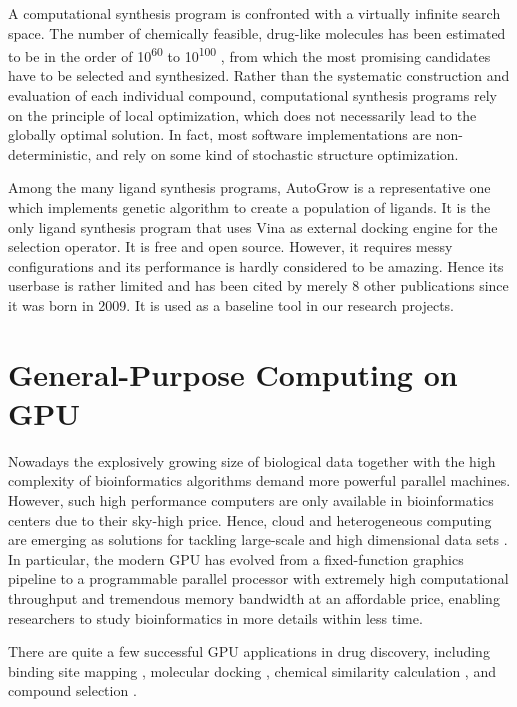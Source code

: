 A computational synthesis program is confronted with a virtually infinite search space. The number of chemically feasible, drug-like molecules has been estimated to be in the order of 10\textsuperscript{60} to 10\textsuperscript{100} \citep{363}, from which the most promising candidates have to be selected and synthesized. Rather than the systematic construction and evaluation of each individual compound, computational synthesis programs rely on the principle of local optimization, which does not necessarily lead to the globally optimal solution. In fact, most software implementations \citep{466,749} are non-deterministic, and rely on some kind of stochastic structure optimization.

Among the many ligand synthesis programs, AutoGrow \citep{466} is a representative one which implements genetic algorithm to create a population of ligands. It is the only ligand synthesis program that uses Vina \citep{595} as external docking engine for the selection operator. It is free and open source. However, it requires messy configurations and its performance is hardly considered to be amazing. Hence its userbase is rather limited and has been cited by merely 8 other publications since it was born in 2009. It is used as a baseline tool in our research projects.

\section{General-Purpose Computing on GPU}

Nowadays the explosively growing size of biological data together with the high complexity of bioinformatics algorithms demand more powerful parallel machines. However, such high performance computers are only available in bioinformatics centers due to their sky-high price. Hence, cloud and heterogeneous computing are emerging as solutions for tackling large-scale and high dimensional data sets \citep{269,267,268}. In particular, the modern GPU has evolved from a fixed-function graphics pipeline to a programmable parallel processor with extremely high computational throughput and tremendous memory bandwidth at an affordable price, enabling researchers to study bioinformatics in more details within less time.

There are quite a few successful GPU applications in drug discovery, including binding site mapping \citep{722}, molecular docking \citep{723,652,779}, chemical similarity calculation \citep{726}, and compound selection \citep{750}.

